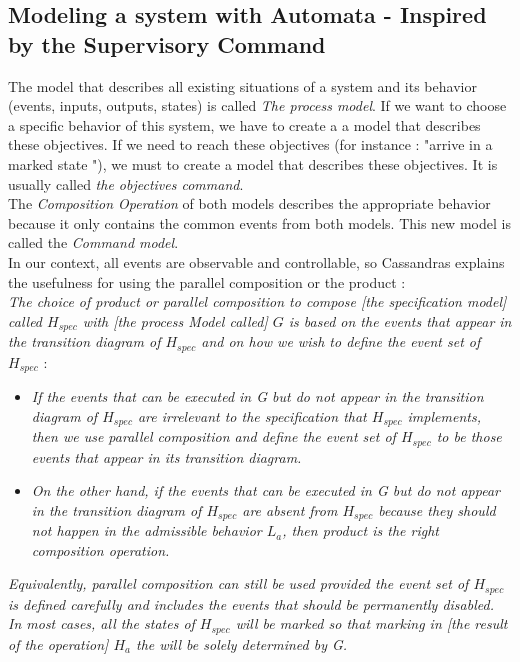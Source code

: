  \subsection{Modeling a system with Automata - Inspired by the Supervisory Command}
The model that describes all existing situations of a system and its behavior (events, inputs, outputs, states) is called \textit{The process model}. If we want to choose a specific behavior of this system, we have to create a a model that describes these objectives. If we need to reach these objectives (for instance : "arrive in a marked state "), we must to create a model that describes these objectives. It is usually called \textit{the objectives command}.\\
The \textit{Composition Operation} of both models describes the appropriate behavior because it only contains the common events from both models. This new model is called the \textit{Command model}.\\
In our context, all events are observable and controllable, so Cassandras explains the usefulness for using the parallel composition or the product :\\
\textit{The choice of product or parallel composition to compose [the specification model] called $H_{spec}$ with [the process Model called] $G$ is based on the events that appear in the transition diagram of $H_{spec}$ and on how we wish to define the event set of $H_{spec}$} :
\begin{itemize}
\item \textit{ If the events that can be executed in G but do not appear in the transition diagram of $H_{spec}$ are irrelevant to the specification that $H_{spec}$ implements, then we use parallel composition and define the event set of $H_{spec}$ to be those events that appear in its transition diagram.}
\item \textit{ On the other hand, if the events that can be executed in G but do not appear in the transition diagram of $H_{spec}$ are absent from $H_{spec}$ because they should not happen in the admissible behavior $L_a$, then product is the right composition operation.}
\end{itemize}
\textit{ Equivalently, parallel composition can still be used provided the event set of $H_{spec}$ is defined carefully and includes the events that should be permanently disabled.\\
 In most cases, all the states of $H_{spec}$ will be marked so that marking in [the result of the operation] $H_a$ the will be solely determined by G.}
 
